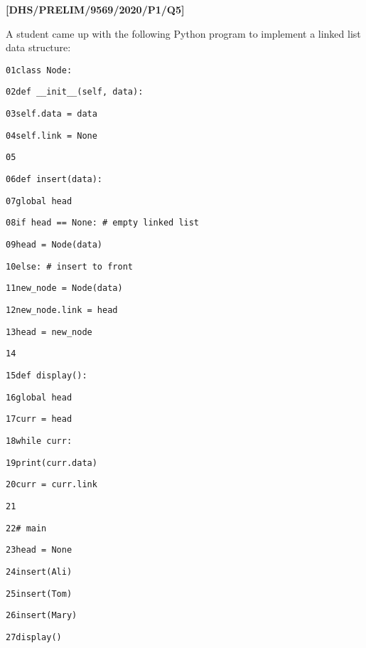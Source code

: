\item \textbf{{[}DHS/PRELIM/9569/2020/P1/Q5{]} }

A student came up with the following Python program to implement a
linked list data structure:

\noindent %
\noindent\begin{minipage}[t]{1\columnwidth}%
\texttt{01\qquad{}class Node: }

\texttt{02\qquad{}\qquad{}def \_\_init\_\_(self, data): }

\texttt{03\qquad{}\qquad{}self.data = data }

\texttt{04\qquad{}\qquad{}self.link = None }

\texttt{05 }

\texttt{06\qquad{}def insert(data): }

\texttt{07\qquad{}\qquad{}global head }

\texttt{08\qquad{}\qquad{}if head == None: \# empty linked list }

\texttt{09\qquad{}\qquad{}\qquad{}head = Node(data) }

\texttt{10\qquad{}\qquad{}else: \# insert to front }

\texttt{11\qquad{}\qquad{}\qquad{}new\_node = Node(data) }

\texttt{12\qquad{}\qquad{}\qquad{}new\_node.link = head }

\texttt{13\qquad{}\qquad{}\qquad{}head = new\_node }

\texttt{14 }

\texttt{15\qquad{}\qquad{}def display(): }

\texttt{16\qquad{}\qquad{}\qquad{}global head }

\texttt{17\qquad{}\qquad{}\qquad{}curr = head }

\texttt{18\qquad{}\qquad{}\qquad{}while curr: }

\texttt{19\qquad{}\qquad{}\qquad{}\qquad{}print(curr.data) }

\texttt{20\qquad{}\qquad{}\qquad{}\qquad{}curr = curr.link }

\texttt{21 }

\texttt{22\qquad{}\# main }

\texttt{23\qquad{}head = None }

\texttt{24\qquad{}insert(\textquotedbl Ali\textquotedbl ) }

\texttt{25\qquad{}insert(\textquotedbl Tom\textquotedbl ) }

\texttt{26\qquad{}insert(\textquotedbl Mary\textquotedbl ) }

\texttt{27\qquad{}display() }%
\end{minipage}
